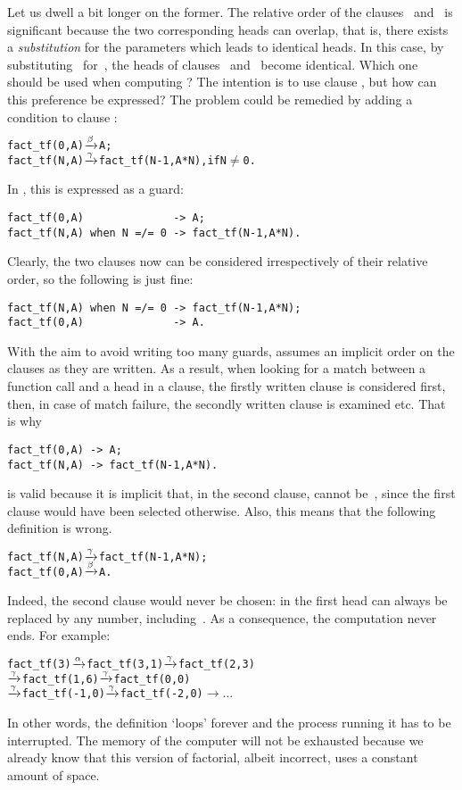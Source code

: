 Let us dwell a bit longer on the former. The relative order of the
clauses \clause{\beta}~and~\clause{\gamma} is significant because the
two corresponding heads can overlap, that is, there exists a
\emph{substitution} for the parameters which leads to identical
heads. In this case, by substituting~ for~, the
heads of clauses \clause{\beta}~and~\clause{\gamma} become
identical. Which one should be used when computing
? The intention is to use clause
\clause{\beta}, but how can this preference be expressed?  The problem
could be remedied by adding a condition to clause \clause{\gamma}:
\begin{alltt}
fact_tf(0,A) \(\xrightarrow{\smash[t]{\beta}}\) A;
fact_tf(N,A) \(\xrightarrow{\smash[t]{\gamma}}\) fact_tf(N-1,A*N), \textrm{if} N \(\neq\) 0.
\end{alltt}
In \Erlang, this is expressed as a guard:
\begin{verbatim}
fact_tf(0,A)              -> A;
fact_tf(N,A) when N =/= 0 -> fact_tf(N-1,A*N).
\end{verbatim}
Clearly, the two clauses now can be considered irrespectively of their
relative order, so the following is just fine:
\begin{verbatim}
fact_tf(N,A) when N =/= 0 -> fact_tf(N-1,A*N);
fact_tf(0,A)              -> A.
\end{verbatim}
With the aim to avoid writing too many guards, \Erlang assumes an
implicit order on the clauses as they are written. As a result, when
looking for a match between a function call and a head in a clause,
the firstly written clause is considered first, then, in case of match
failure, the secondly written clause is examined etc. That is why
\begin{verbatim}
fact_tf(0,A) -> A;
fact_tf(N,A) -> fact_tf(N-1,A*N).
\end{verbatim}
is valid because it is implicit that, in the second clause,
 cannot be~, since the first clause would have
been selected otherwise. Also, this means that the following
definition is wrong.
\begin{alltt}
fact_tf(N,A) \(\xrightarrow{\smash[t]{\gamma}}\) fact_tf(N-1,A*N);
fact_tf(0,A) \(\xrightarrow{\smash[t]{\beta}}\) A.
\end{alltt}
Indeed, the second clause would never be chosen: 
in the first head can always be replaced by any number,
including~. As a consequence, the computation never
ends. For example:
\begin{alltt}
fact_tf(3) \(\xrightarrow{\smash[t]{\alpha}}\) fact_tf( 3,1) \(\xrightarrow{\smash[t]{\gamma}}\) fact_tf( 2,3)
           \(\xrightarrow{\smash[t]{\gamma}}\) fact_tf( 1,6) \(\xrightarrow{\smash[t]{\gamma}}\) fact_tf( 0,0)
           \(\xrightarrow{\smash[t]{\gamma}}\) fact_tf(-1,0) \(\xrightarrow{\smash[t]{\gamma}}\) fact_tf(-2,0) \(\rightarrow \ldots\)
\end{alltt}
In other words, the \Erlang definition `loops' forever and the
process running it has to be interrupted. The memory of the computer
will not be exhausted because we already know that this version of
factorial, albeit incorrect, uses a constant amount of space.

